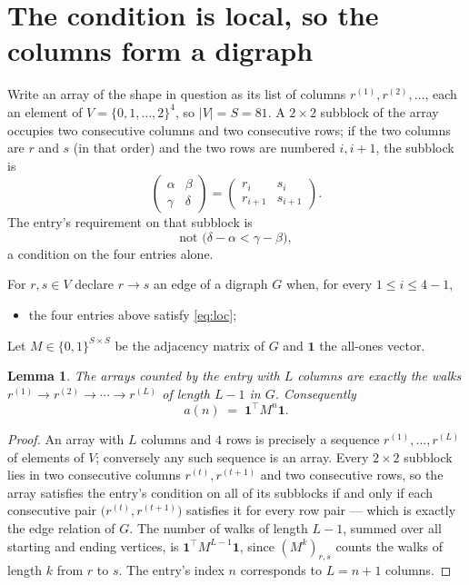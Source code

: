 \documentclass[11pt,a4paper]{article}
\theoremstyle{plain}
\newtheorem{lemma}[theorem]{Lemma}
\theoremstyle{definition}
\begin{document}
\section{The condition is local, so the columns form a digraph}

Write an array of the shape in question as its list of columns
$r^{(1)},r^{(2)},\dots$, each an element of
$V=\{0,1,\dots,2\}^{4}$, so $|V|=S=81$. A $2\times2$ subblock of the array
occupies two consecutive columns and two consecutive rows; if the two columns are $r$
and $s$ (in that order) and the two rows are numbered $i,i+1$,
the subblock is
\[
\begin{pmatrix}\alpha&\beta\\\gamma&\delta\end{pmatrix}=\begin{pmatrix}r_i&s_i\\r_{i+1}&s_{i+1}\end{pmatrix}.
\]
The entry's requirement on that subblock is
\begin{equation}\label{eq:loc}
\text{not }\bigl(\delta-\alpha<\gamma-\beta\bigr),
\end{equation}
a condition on the four entries alone.

For $r,s\in V$ declare $r\to s$ an edge of a digraph $G$ when, for every
$1\le i\le 4-1$,
\begin{itemize}
\item the four entries above satisfy \eqref{eq:loc};

\end{itemize}
Let $M\in\{0,1\}^{S\times S}$ be the adjacency matrix of $G$ and $\mathbf{1}$ the
all-ones vector.

\begin{lemma}\label{lem:walk}
The arrays counted by the entry with $L$ columns are exactly the walks
$r^{(1)}\to r^{(2)}\to\cdots\to r^{(L)}$ of length $L-1$ in $G$. Consequently
\[
a(n)\;=\;\mathbf{1}^{\!\top}M^{n}\mathbf{1} .
\]
\end{lemma}

\begin{proof}
An array with $L$ columns and $4$ rows is precisely a sequence
$r^{(1)},\dots,r^{(L)}$ of elements of $V$; conversely any such sequence is an array.
Every $2\times2$ subblock lies in two consecutive columns $r^{(t)},r^{(t+1)}$ and two
consecutive rows, so the array satisfies the entry's condition on all of its subblocks
if and only if each consecutive pair $\bigl(r^{(t)},r^{(t+1)}\bigr)$ satisfies it for
every row pair --- which is exactly the edge relation of $G$. The number of walks of
length $L-1$, summed over all starting and ending vertices, is
$\mathbf{1}^{\!\top}M^{L-1}\mathbf{1}$, since $(M^{k})_{r,s}$ counts the walks of
length $k$ from $r$ to $s$. The entry's index $n$ corresponds to $L=n+1$ columns.
\end{proof}
\end{document}
